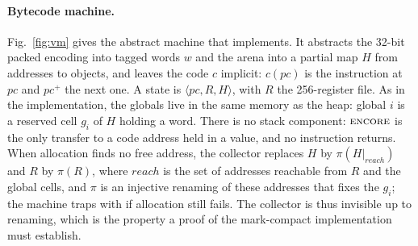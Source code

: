 \paragraph{Bytecode machine.}
Fig.~\ref{fig:vm} gives the abstract machine that  implements.
It abstracts the 32-bit packed encoding into tagged words $w$ and the arena into a partial map $H$ from addresses to objects, and leaves the code $c$ implicit: $c(pc)$ is the instruction at $pc$ and $pc^{+}$ the next one.
A state is $\langle pc, R, H \rangle$, with $R$ the 256-register file. As in the implementation, the globals live in the same memory as the heap: global $i$ is a reserved cell $g_i$ of $H$ holding a word.
There is no stack component: $\textsc{encore}$ is the only transfer to a code address held in a value, and no instruction returns.
When allocation finds no free address, the collector replaces $H$ by $\pi(H|_{\mathit{reach}})$ and $R$ by $\pi(R)$, where $\mathit{reach}$ is the set of addresses reachable from $R$ and the global cells, and $\pi$ is an injective renaming of these addresses that fixes the $g_i$; the machine traps with  if allocation still fails.
The collector is thus invisible up to renaming, which is the property a proof of the mark-compact implementation must establish.

